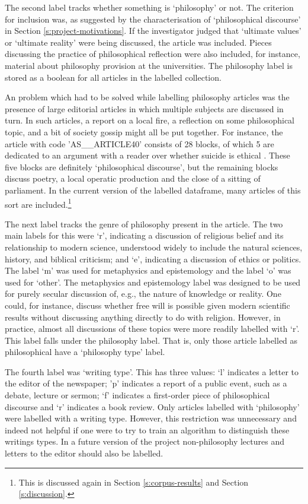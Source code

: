 \documentclass{article}
\begin{document}
The second label tracks whether something is `philosophy' or not. The criterion for inclusion was, as suggested by the characterisation of `philosophical discourse' in Section \ref{s:project-motivations}. If the investigator judged that `ultimate values' or `ultimate reality' were being discussed, the article was included. Pieces discussing the practice of philosophical reflection were also included, for instance, material about philosophy provision at the universities. The philosophy label is stored as a boolean for all articles in the labelled collection.

An problem which had to be solved while labelling philosophy articles was the presence of large editorial articles in which multiple subjects are discussed in turn. In such articles, a report on a local fire, a reflection on some philosophical topic, and a bit of society gossip might all be put together. For instance, the article with code 'AS\_\_\-ARTICLE40' consists of 28 blocks, of which 5 are dedicated to an argument with a reader over whether suicide is ethical \cite{suicide-example}. These five blocks are definitely `philosophical discourse', but the remaining blocks discuss poetry, a local operatic production and the close of a sitting of parliament. In the current version of the labelled dataframe, many articles of this sort are included.\footnote{This is discussed again in Section \ref{s:corpus-results} and Section \ref{s:discussion}.}

The next label tracks the genre of philosophy present in the article. The two main labels for this were `r', indicating a discussion of religious belief and its relationship to modern science, understood widely to include the natural sciences, history, and biblical criticism; and `e', indicating a discussion of ethics or politics. The label `m' was used for metaphysics and epistemology and the label `o' was used for `other'. The metaphysics and epistemology label was designed to be used for purely secular discussion of, e.g., the nature of knowledge or reality. One could, for instance, discuss whether free will is possible given modern scientific results without discussing anything directly to do with religion. However, in practice, almost all discussions of these topics were more readily labelled with `r'. This label falls under the philosophy label. That is, only those article labelled as philosophical have a `philosophy type' label.

The fourth label was `writing type'. This has three values: `l' indicates a letter to the editor of the newspaper; 'p' indicates a report of a public event, such as a debate, lecture or sermon; `f' indicates a first-order piece of philosophical discourse and `r' indicates a book review. Only articles labelled with `philosophy' were labelled with a writing type. However, this restriction was unnecessary and indeed not helpful if one were to try to train an algorithm to distinguish these writings types. In a future version of the project non-philosophy lectures and letters to the editor should also be labelled.
\end{document}
